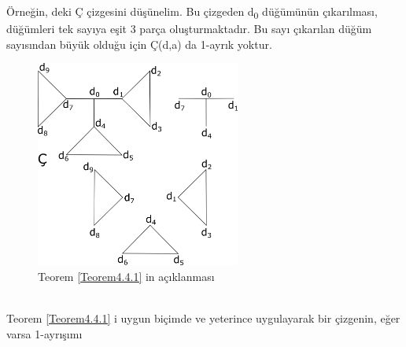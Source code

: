 \documentclass[11pt]{amsbook}
\begin{document}
Örneğin,  deki Ç çizgesini düşünelim. Bu çizgeden d\textsubscript{0} düğümünün çıkarılması, düğümleri tek sayıya eşit 3 parça oluşturmaktadır. Bu sayı çıkarılan düğüm sayısından büyük olduğu için Ç(d,a) da 1-ayrık yoktur.
\begin{figure}[h]
	\centering
	\includegraphics[width=0.6\textwidth]{images/ceyhun-219-fig01}
	\caption{Teorem \ref{Teorem4.4.1} in açıklanması}
	\label{fig:ceyhun-219-Sekil4.4.2}
\end{figure}
\\Teorem \ref{Teorem4.4.1} i uygun biçimde ve yeterince uygulayarak bir çizgenin, eğer varsa 1-ayrışımı
\end{document}
